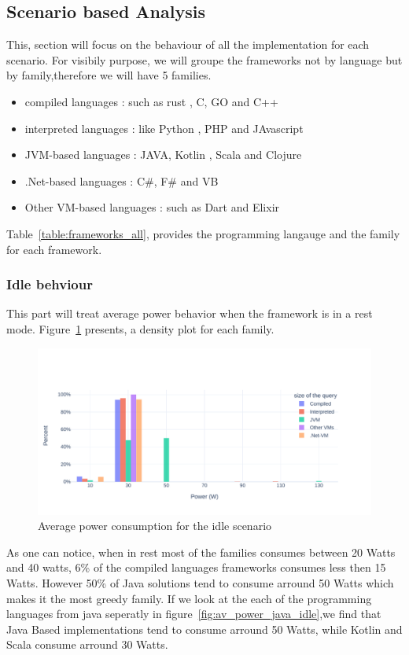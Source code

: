 \subsection{Scenario based Analysis}
This, section will focus on the behaviour of all the implementation for each scenario. For visibily purpose, we will groupe the frameworks not by language but by family,therefore we will have 5 families.
\begin{itemize}
    \item compiled languages : such as rust , C, GO and C++
    \item interpreted languages : like Python , PHP and JAvascript
    \item JVM-based languages : JAVA, Kotlin , Scala and Clojure
    \item .Net-based languages : C\#, F\# and VB
    \item Other VM-based languages : such as Dart and Elixir
\end{itemize}

Table~\ref{table:frameworks_all}, provides the programming langauge and the family for each framework.

\subsubsection{Idle behviour}
This part will treat average power behavior when the framework is in a rest mode. Figure~\ref{fig:av_power_idle} presents, a density plot for each family.
\begin{figure}[bht]
    \centering
    \label{fig:av_power_idle}
    \includegraphics[width=1.0\columnwidth]{imgs/av_power_idle}
    \caption{Average power consumption for the idle scenario}
\end{figure}
As one can notice, when in rest most of the families consumes between 20 Watts and 40 watts, 6\% of the compiled languages frameworks consumes less then 15 Watts. However 50\% of Java solutions tend to consume arround 50 Watts which makes it the most greedy family.
If we look at the each of the programming languages from java seperatly in figure~\ref{fig:av_power_java_idle},we find that Java Based implementations tend to consume arround 50 Watts, while Kotlin and Scala consume arround 30 Watts.


